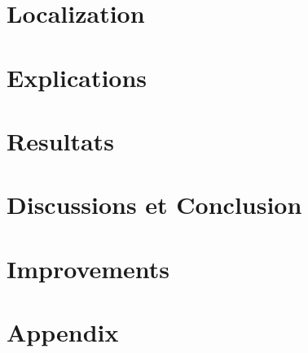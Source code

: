 \documentclass[12pt]{article}
\begin{document}
\section{Localization}



\section{Explications}


\section{Resultats}



\section{Discussions et Conclusion}


\section{Improvements}


%
%

\appendix
\section{Appendix}




\end{document}
